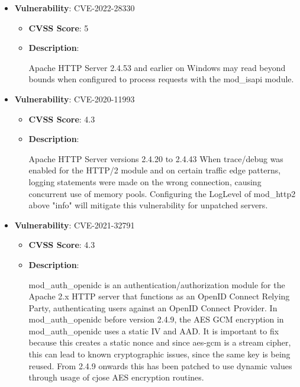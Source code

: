 \documentclass{article}
\begin{document}
\begin{itemize}
        \item \textbf{Vulnerability}: CVE-2022-28330
        \begin{itemize}
            \item \textbf{CVSS Score}:  5 
            \item \textbf{Description}:
            \parbox[t]{0.9\linewidth}{
                \ttfamily Apache HTTP Server 2.4.53 and earlier on Windows may read beyond bounds when configured to process requests with the mod\_isapi module.
            }
        \end{itemize}
    
        \item \textbf{Vulnerability}: CVE-2020-11993
        \begin{itemize}
            \item \textbf{CVSS Score}:  4.3 
            \item \textbf{Description}:
            \parbox[t]{0.9\linewidth}{
                \ttfamily Apache HTTP Server versions 2.4.20 to 2.4.43 When trace/debug was enabled for the HTTP/2 module and on certain traffic edge patterns, logging statements were made on the wrong connection, causing concurrent use of memory pools. Configuring the LogLevel of mod\_http2 above "info" will mitigate this vulnerability for unpatched servers.
            }
        \end{itemize}
    
        \item \textbf{Vulnerability}: CVE-2021-32791
        \begin{itemize}
            \item \textbf{CVSS Score}:  4.3 
            \item \textbf{Description}:
            \parbox[t]{0.9\linewidth}{
                \ttfamily mod\_auth\_openidc is an authentication/authorization module for the Apache 2.x HTTP server that functions as an OpenID Connect Relying Party, authenticating users against an OpenID Connect Provider. In mod\_auth\_openidc before version 2.4.9, the AES GCM encryption in mod\_auth\_openidc uses a static IV and AAD. It is important to fix because this creates a static nonce and since aes-gcm is a stream cipher, this can lead to known cryptographic issues, since the same key is being reused. From 2.4.9 onwards this has been patched to use dynamic values through usage of cjose AES encryption routines.
            }
        \end{itemize}
    

\end{itemize}
\end{document}
